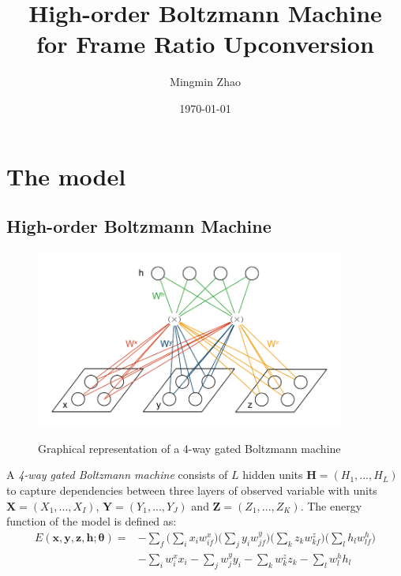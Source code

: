 \documentclass{article}
\begin{document}
\title{\textbf{High-order Boltzmann Machine \\for Frame Ratio Upconversion}}
\author{Mingmin Zhao}

\date{\today}
\maketitle


\section{The model}

\subsection{High-order Boltzmann Machine}

\begin{figure}
  \centering
  \includegraphics[width=4in]{4GRBM}\\
  \caption{Graphical representation of a 4-way gated Boltzmann machine}\label{4GRBM}
\end{figure}

A \textit{4-way gated Boltzmann machine} consists of $L$ hidden units $\boldsymbol{H} = (H_1, ..., H_L)$ to capture dependencies between three layers of observed variable with units $\boldsymbol{X} = (X_1, ..., X_I)$, $\boldsymbol{Y} = (Y_1, ..., Y_J)$ and $\boldsymbol{Z} = (Z_1, ..., Z_K)$.
The energy function of the model is defined as:
\begin{equation}
\begin{split}
E(\boldsymbol{x},\boldsymbol{y},\boldsymbol{z},\boldsymbol{h};\boldsymbol{\theta}) = &-\sum_f{\bigg(\sum_i{x_i w_{if}^x}\bigg) \bigg(\sum_j{y_i w_{jf}^y}\bigg) \bigg(\sum_k{z_k w_{kf}^z}\bigg) \bigg(\sum_l{h_l w_{lf}^h}\bigg)}
\\
&- \sum_i{w_{i}^x x_i} - \sum_j{w_{j}^y y_i} - \sum_k{w_{k}^z z_k} - \sum_l{w_{l}^h h_l}
\end{split}
\end{equation}
\end{document}
